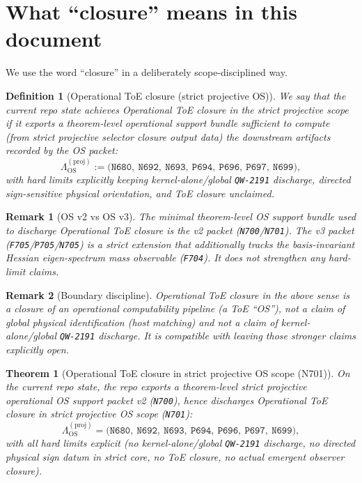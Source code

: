 \documentclass[11pt,a4paper]{article}
\newtheorem{theorem}{Theorem}[section]
\newtheorem{definition}{Definition}[section]
\newtheorem{remark}{Remark}[section]
\begin{document}
\section{What “closure” means in this document}

We use the word “closure” in a deliberately scope-disciplined way.

\begin{definition}[Operational ToE closure (strict projective OS)]
We say that the current repo state achieves \emph{Operational ToE closure} in the strict \emph{projective} scope if it exports a theorem-level
operational support bundle sufficient to compute (from strict projective selector closure output data) the downstream artifacts recorded by the OS packet:
\[
\Lambda_{\mathrm{OS}}^{(\mathrm{proj})} :=
\bigl(
\texttt{N680},\ \texttt{N692},\ \texttt{N693},\ \texttt{P694},\ \texttt{P696},\ \texttt{P697},\ \texttt{N699}
\bigr),
\]
with hard limits explicitly keeping \emph{kernel-alone/global} \texttt{QW-2191} discharge, directed sign-sensitive physical orientation, and ToE closure unclaimed.
\end{definition}

\begin{remark}[OS v2 vs OS v3]
The minimal theorem-level OS support bundle used to discharge \emph{Operational ToE closure} is the v2 packet (\texttt{N700}/\texttt{N701}).
The v3 packet (\texttt{F705}/\texttt{P705}/\texttt{N705}) is a strict extension that additionally tracks the basis-invariant Hessian eigen-spectrum mass observable (\texttt{F704}).
It does not strengthen any hard-limit claims.
\end{remark}

\begin{remark}[Boundary discipline]
Operational ToE closure in the above sense is a closure of an \emph{operational computability pipeline} (a ToE “OS”), not a claim of global physical identification
(host matching) and not a claim of kernel-alone/global \texttt{QW-2191} discharge. It is compatible with leaving those stronger claims explicitly open.
\end{remark}

\begin{theorem}[Operational ToE closure in strict projective OS scope (N701)]
On the current repo state, the repo exports a theorem-level strict projective operational OS support packet v2 (\texttt{N700}), hence discharges
Operational ToE closure in strict projective OS scope (\texttt{N701}):
\[
\Lambda_{\mathrm{OS}}^{(\mathrm{proj})} =
\bigl(
\texttt{N680},\ \texttt{N692},\ \texttt{N693},\ \texttt{P694},\ \texttt{P696},\ \texttt{P697},\ \texttt{N699}
\bigr),
\]
with all hard limits explicit (no kernel-alone/global \texttt{QW-2191} discharge, no directed physical sign datum in strict core, no ToE closure, no actual emergent observer closure).
\end{theorem}
\end{document}
